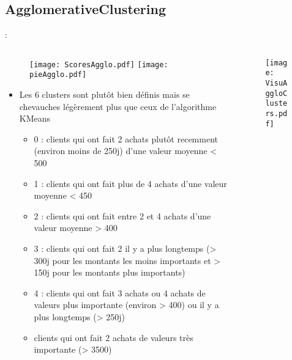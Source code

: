 \documentclass[8pt,aspectratio=169,hyperref={unicode=true}]{beamer}
\begin{document}
\subsection{AgglomerativeClustering}
\begin{frame}{\insertsection: \insertsubsection}
    \begin{columns}
        \begin{column}{.55\textwidth}
            \begin{figure}
                \texttt{[image: ScoresAgglo.pdf]}
                \texttt{[image: pieAgglo.pdf]}
            \end{figure}
            \begin{itemize}
                \footnotesize
                \item Les 6 clusters sont plutôt bien définis mais se chevauches légèrement plus que ceux de l'algorithme KMeans
                \begin{itemize}
                    \scriptsize
                    \item 0 : clients qui ont fait 2 achats plutôt recemment (environ moins de 250j) d'une valeur moyenne < 500
                    \item 1 : clients qui ont fait plus de 4 achats d'une valeur moyenne < 450
                    \item 2 : clients qui ont fait entre 2 et 4 achats d'une valeur moyenne > 400
                    \item 3 : clients qui ont fait 2 il y a plus longtemps (> 300j pour les montants les moins importants et > 150j pour les montants plus importants)
                    \item 4 : clients qui ont fait 3 achats ou 4 achats de valeurs plus importante (environ > 400) ou il y a plus longtemps (> 250j)
                    \item clients qui ont fait 2 achats de valeurs très importante (> 3500)
                \end{itemize}
            \end{itemize}
        \end{column}
        \begin{column}{.45\textwidth}
            \begin{figure}
                \texttt{[image: VisuAggloClusters.pdf]}
            \end{figure}
        \end{column}
    \end{columns}
\end{frame}
\end{document}
